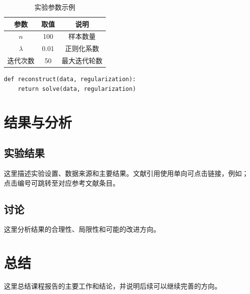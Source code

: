\documentclass[course]{course-report}
\begin{document}
\begin{table}[htbp]
  \caption{实验参数示例}
  \label{tab:example}
  \begin{tabular}{ccc}
    \toprule
    参数 & 取值 & 说明 \\
    \midrule
    $n$ & 100 & 样本数量 \\
    $\lambda$ & 0.01 & 正则化系数 \\
    迭代次数 & 50 & 最大迭代轮数 \\
    \bottomrule
  \end{tabular}
\end{table}

\begin{listing}[htbp]
  \begin{Verbatim}[frame=single,fontsize=\small]
def reconstruct(data, regularization):
    return solve(data, regularization)
  \end{Verbatim}
  \caption{算法实现示例}
  \label{lst:example}
\end{listing}

\chapter{结果与分析}

\section{实验结果}

这里描述实验设置、数据来源和主要结果。文献引用使用单向可点击链接，例如；点击编号可跳转至对应参考文献条目。

\section{讨论}

这里分析结果的合理性、局限性和可能的改进方向。

\chapter{总结}

这里总结课程报告的主要工作和结论，并说明后续可以继续完善的方向。


\end{document}
